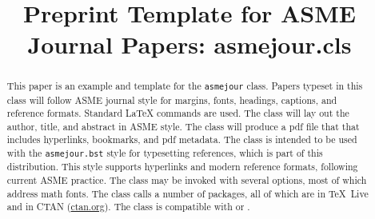 \documentclass[largesc,upint,varvw,barcolor=Red4,nocopyright,hyphenate,balance,lang-second=french,lang=english]{asmejour}
\begin{document}




\title{Preprint Template for ASME\\ Journal Papers:  asmejour.cls}


 
   
\begin{abstract}
This paper is an example and template for the {\upshape\texttt{asmejour}} class. Papers typeset in this class will follow ASME journal style for margins, fonts, headings, captions, and reference formats. Standard {\upshape\LaTeX} commands are used. The class will lay out the author, title, and abstract in ASME style. The class will produce a pdf file that that includes hyperlinks, bookmarks, and pdf metadata. The class is intended to be used with the {\upshape\texttt{asmejour.bst} } style for typesetting references, which is part of this distribution.  This style supports hyperlinks and modern reference formats, following current ASME practice. The class may be invoked with several options, most of which address math fonts. The class calls a number of packages, all of which are in {\upshape\TeX~Live} and in CTAN (\href{http://ctan.org}{ctan.org}). The class is compatible with {\upshape{}} or {\upshape{}}.
\end{abstract}
\end{document}
